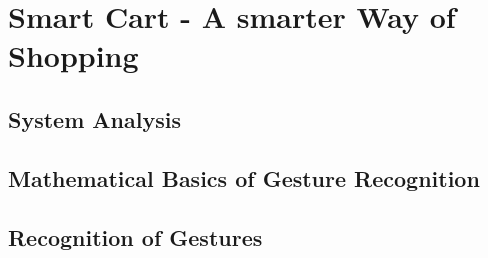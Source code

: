 \documentclass[12pt, a4paper, oneside, british]{report}
\begin{document}
\onehalfspacing
\setlength\epigraphrule{0pt}
\setlength{\epigraphwidth}{0.8\textwidth}
\renewcommand{\epigraphflush}{flushleft}




\tableofcontents 
\newpage

\setcounter{page}{1}




\chapter{Smart Cart - A smarter Way of Shopping}



\section{System Analysis}


\FloatBarrier 
\section{Mathematical Basics of Gesture Recognition}


\FloatBarrier
\section{Recognition of Gestures}



 
\end{document}

